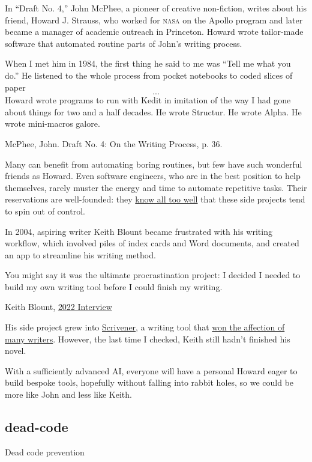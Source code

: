 \documentclass{article}
\begin{document}
In ``Draft No. 4,'' John McPhee, a pioneer of creative non-fiction, writes about his friend,
Howard J. Strauss, who worked for \textsc{nasa} on the Apollo program and later became a manager of academic outreach in Princeton.
Howard wrote tailor-made software that automated routine parts of John's writing process.

\epigraph{
  When I met him in 1984, the first thing he said to me was ``Tell me what you do.''
  He listened to the whole process from pocket notebooks to coded slices of paper \[...\]
  Howard wrote programs to run with Kedit in imitation of the way I had gone about things for two and a half decades.
  He wrote Structur. He wrote Alpha. He wrote mini-macros galore.
}{McPhee, John. Draft No. 4: On the Writing Process, p. 36.}

Many can benefit from automating boring routines, but few have such wonderful friends as Howard.
Even software engineers, who are in the best position to help themselves, rarely muster the energy and time to automate repetitive tasks.
Their reservations are well-founded: they \href{https://xkcd.com/1319/}{know all too well} that these side projects tend to spin out of control.

In 2004, aspiring writer Keith Blount became frustrated with his writing workflow,
which involved piles of index cards and Word documents,
and created an app to streamline his writing method.

\epigraph{
You might say it was the ultimate procrastination project: I decided I needed to build my own writing tool before I could finish my writing.
}{Keith Blount, \href{https://syntopikon.substack.com/p/an-interview-with-keith-blount}{2022 Interview}}

His side project grew into \href{https://www.literatureandlatte.com/scrivener/overview}{Scrivener},
a writing tool that \href{https://podcast.scrivenerapp.com/}{won the affection of many writers}.
However, the last time I checked, Keith still hadn't finished his novel.

With a sufficiently advanced AI, everyone will have a personal Howard eager to build bespoke tools,
hopefully without falling into rabbit holes, so we could be more like John and less like Keith.

\subsection{dead-code}{Dead code prevention}
\end{document}
